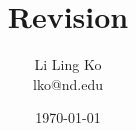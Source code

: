 \documentclass{article}
\begin{document}
\title{Revision}
\author{Li Ling Ko\\ lko@nd.edu}
\date{\today}
\maketitle





\end{document}
